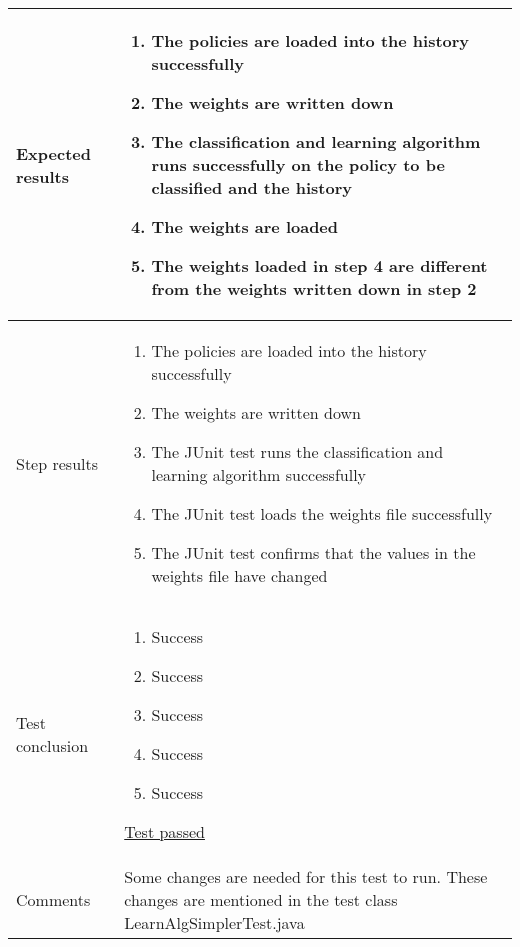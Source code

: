 \begin{center}
\begin{longtable}{ | p{4cm} | p{10cm} | }
			Expected results &	\begin{enumerate}
							\item The policies are loaded into the history successfully
							\item The weights are written down
							\item The classification and learning algorithm runs successfully on the policy to be classified and the history
							\item The weights are loaded
							\item The weights loaded in step 4 are different from the weights written down in step 2
						\end{enumerate}
							 \\  [3pt] \hline

			Step results & 	\begin{enumerate}
							\item The policies are loaded into the history successfully
							\item The weights are written down
							\item The JUnit test runs the classification and learning algorithm successfully
							\item The JUnit test loads the weights file successfully
							\item The JUnit test confirms that the values in the weights file have changed
						\end{enumerate}
							 \\  [3pt] \hline

			Test conclusion & 	\begin{enumerate}
							\item Success
							\item Success
							\item Success
							\item Success
							\item Success
						\end{enumerate}
						\underline{Test passed} \\ [3pt] \hline
			Comments & Some changes are needed for this test to run. These changes are mentioned in the test class LearnAlgSimplerTest.java
				\\ [3pt] \hline
		\end{longtable}
	\end{center}

